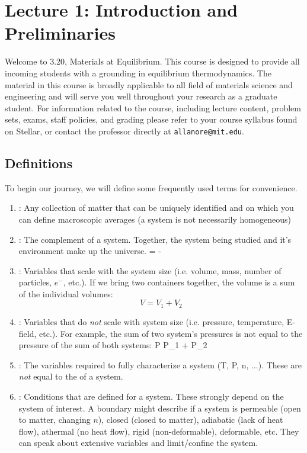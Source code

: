 \documentclass[12pt]{article}
\begin{document}

\section{Lecture 1: Introduction and Preliminaries}
Welcome to 3.20, Materials at Equilibrium.  This course is designed to provide all incoming students with a grounding in equilibrium thermodynamics.  The material in this course is broadly applicable to all field of materials science and engineering and will serve you well throughout your research as a graduate student.  For information related to the course, including lecture content, problem sets, exams, staff policies, and grading please refer to your course syllabus found on Stellar, or contact the professor directly at \texttt{allanore@mit.edu}.

\subsection{Definitions}
To begin our journey, we will define some frequently used terms for convenience.

\begin{enumerate}
\item {}: Any collection of matter that can be uniquely identified and on which you can define macroscopic averages (a system is not necessarily homogeneous)
\item {}: The complement of a system. Together, the system being studied and it's environment make up the universe. 
\eqs
\text{[environment]} = \text{[universe]} - \text{[system]}
\eqe
\item {}: Variables that scale with the system size (i.e. volume, mass, number of particles, $e^-$, etc.).  If we bring two containers together, the volume is a sum of the individual volumes:
\begin{equation}
V = V_1 + V_2
\end{equation}
\item {}: Variables that do \emph{not} scale with system size (i.e. pressure, temperature, E-field, etc.).  For example, the sum of two system's pressures is not equal to the pressure of the sum of both systems:
\eqs
P \neq P_1 + P_2
\eqe
\item {}: The variables required to fully characterize a system (T, P, n, ...).  These are \emph{not} equal to the  of a system.
\item {}: Conditions that are defined for a system.  These strongly depend on the system of interest.  A boundary might describe if a system is permeable (open to matter, changing $n$), closed (closed to matter), adiabatic (lack of heat flow), athermal (no heat flow), rigid (non-deformable), deformable, etc.  They can speak about extensive variables and limit/confine the system.
\end{enumerate}
\end{document}
